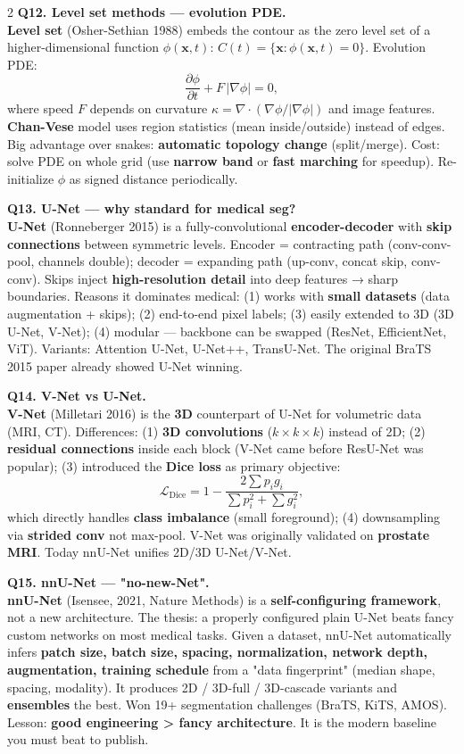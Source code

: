 \begin{paracol}{2}
\textbf{Q12. Level set methods — evolution PDE.}\\
\textbf{Level set} (Osher-Sethian 1988) embeds the contour as the zero level set of a higher-dimensional function $\phi(\mathbf{x},t)$: $C(t)=\{\mathbf{x}:\phi(\mathbf{x},t)=0\}$. Evolution PDE:
\[\frac{\partial\phi}{\partial t}+F\,|\nabla\phi|=0,\]
where speed $F$ depends on curvature $\kappa=\nabla\!\cdot\!(\nabla\phi/|\nabla\phi|)$ and image features. \textbf{Chan-Vese} model uses region statistics (mean inside/outside) instead of edges. Big advantage over snakes: \textbf{automatic topology change} (split/merge). Cost: solve PDE on whole grid (use \textbf{narrow band} or \textbf{fast marching} for speedup). Re-initialize $\phi$ as signed distance periodically.

\textbf{Q13. U-Net — why standard for medical seg?}\\
\textbf{U-Net} (Ronneberger 2015) is a fully-convolutional \textbf{encoder-decoder} with \textbf{skip connections} between symmetric levels. Encoder = contracting path (conv-conv-pool, channels double); decoder = expanding path (up-conv, concat skip, conv-conv). Skips inject \textbf{high-resolution detail} into deep features → sharp boundaries. Reasons it dominates medical: (1) works with \textbf{small datasets} (data augmentation + skips); (2) end-to-end pixel labels; (3) easily extended to 3D (3D U-Net, V-Net); (4) modular — backbone can be swapped (ResNet, EfficientNet, ViT). Variants: Attention U-Net, U-Net++, TransU-Net. The original BraTS 2015 paper already showed U-Net winning.

\textbf{Q14. V-Net vs U-Net.}\\
\textbf{V-Net} (Milletari 2016) is the \textbf{3D} counterpart of U-Net for volumetric data (MRI, CT). Differences: (1) \textbf{3D convolutions} ($k\times k\times k$) instead of 2D; (2) \textbf{residual connections} inside each block (V-Net came before ResU-Net was popular); (3) introduced the \textbf{Dice loss} as primary objective:
\[\mathcal{L}_{\text{Dice}}=1-\frac{2\sum p_i g_i}{\sum p_i^2+\sum g_i^2},\]
which directly handles \textbf{class imbalance} (small foreground); (4) downsampling via \textbf{strided conv} not max-pool. V-Net was originally validated on \textbf{prostate MRI}. Today nnU-Net unifies 2D/3D U-Net/V-Net.

\textbf{Q15. nnU-Net — "no-new-Net".}\\
\textbf{nnU-Net} (Isensee, 2021, Nature Methods) is a \textbf{self-configuring framework}, not a new architecture. The thesis: a properly configured plain U-Net beats fancy custom networks on most medical tasks. Given a dataset, nnU-Net automatically infers \textbf{patch size, batch size, spacing, normalization, network depth, augmentation, training schedule} from a "data fingerprint" (median shape, spacing, modality). It produces 2D / 3D-full / 3D-cascade variants and \textbf{ensembles} the best. Won 19+ segmentation challenges (BraTS, KiTS, AMOS). Lesson: \textbf{good engineering > fancy architecture}. It is the modern baseline you must beat to publish.


\end{paracol}
